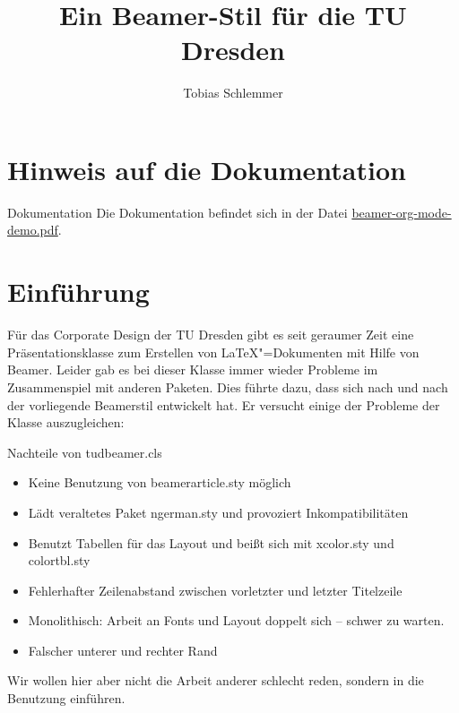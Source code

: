 \usepackage{xcolor}
\usepackage{listings}
\title{Ein Beamer-Stil für die TU Dresden}
\author{Tobias Schlemmer}

\maketitle
\frame{\tableofcontents}
\section{Hinweis auf die Dokumentation}
\begin{frame}{Dokumentation}
  Die Dokumentation befindet sich in der Datei
  \url{beamer-org-mode-demo.pdf}.
\end{frame}
\section{Einführung}
\begin{frame}

Für das Corporate Design der TU Dresden gibt es seit geraumer Zeit eine Präsentationsklasse zum Erstellen von \LaTeX{}"=Dokumenten mit Hilfe von Beamer. Leider gab es bei dieser Klasse immer wieder Probleme im Zusammenspiel mit anderen Paketen. Dies führte dazu, dass sich nach und nach der vorliegende Beamerstil entwickelt hat. Er versucht einige der Probleme der Klasse auszugleichen:
\end{frame}
\begin{frame}
  \begin{block}{Nachteile von tudbeamer.cls}
    \begin{itemize}
    \item Keine Benutzung von beamerarticle.sty möglich
    \item Lädt veraltetes Paket ngerman.sty und provoziert Inkompatibilitäten
    \item Benutzt Tabellen für das Layout und beißt sich mit xcolor.sty und colortbl.sty
    \item Fehlerhafter Zeilenabstand zwischen vorletzter und letzter Titelzeile
    \item Monolithisch: Arbeit an Fonts und Layout doppelt sich – schwer zu warten.
    \item Falscher unterer und rechter Rand
    \end{itemize}
  \end{block}
  Wir wollen hier aber nicht die Arbeit anderer schlecht reden, sondern in die Benutzung einführen.
\end{frame}

